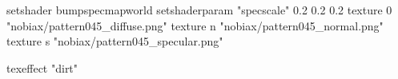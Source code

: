 setshader bumpspecmapworld
setshaderparam "specscale" 0.2 0.2 0.2
   texture 0 "nobiax/pattern045_diffuse.png"
   texture n "nobiax/pattern045_normal.png"
   texture s "nobiax/pattern045_specular.png"

texeffect "dirt"
